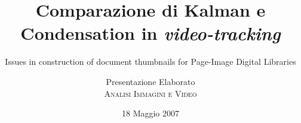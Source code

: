 \documentclass{beamer}
\institute[Università degli studi di Firenze, Facoltà di Ingegneria] %
{
\begin{minipage}[t]{0.4\textwidth}
 \textbf{Docente:} \\ \professor \\
\textbf{Assistenti:} \\ \firstassistant \\  \secondassistant
\end{minipage} 
\hfill
\begin{minipage}[t]{0.4\textwidth}
\begin{flushright}
\textbf{Autori:} \\ \firstauthor \\ \secondauthor \\ \thirdauthor
\end{flushright}
\end{minipage}
}
\title[Presentazione Analisi Immagini e Video] {Comparazione di Kalman e Condensation in \textit{video-tracking}}
\subtitle{Issues in construction of document thumbnails for Page-Image Digital Libraries}
\author[Nicola Martorana\\Iacopo Masi\\Marco Meoni\\ \hrulefill]%
{{Presentazione Elaborato}\\ \textsc{ Analisi Immagini e Video}}
\date[Presentazione elaborato] %
{
   18 Maggio 2007
}
\begin{document}
\def\firstauthor{Nicola Martorana}
\def\secondauthor{Iacopo Masi}
\def\thirdauthor{Marco Meoni}
\def\coursenumber{ARC}
\def\class{Relazione di Analisi Immagini e Video}
\def\title{Comparazione di Kalman e ConDensation in video-tracking}
\def\semester{2006/2007}
\def\instructor{P. Crescenzi}
\def\date{Maggio 2007}
\def\professor{Prof. Pietro Pala}
\def\firstassistant{Ing. Walter Nunziati}
\def\secondassistant{Ing. Andy Bagdanov}
\end{document}
